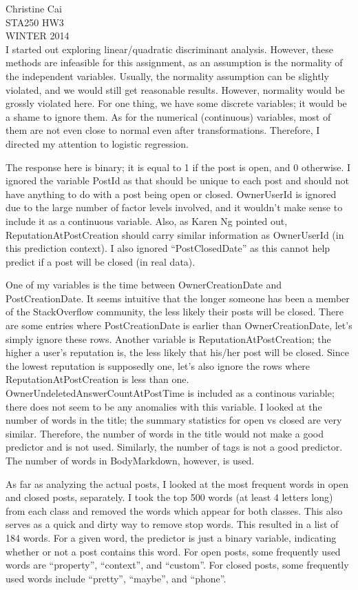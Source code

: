 \documentclass[12pt]{article}
\begin{document}
\noindent Christine Cai\\
STA250 HW3\\
WINTER 2014\\

I started out exploring linear/quadratic discriminant analysis. However, these methods are infeasible for this assignment, as an assumption is the normality of the independent variables. Usually, the normality assumption can be slightly violated, and we would still get reasonable results. However, normality would be grossly violated here. For one thing, we have some discrete variables; it would be a shame to ignore them. As for the numerical (continuous) variables, most of them are not even close to normal even after transformations. Therefore, I directed my attention to logistic regression.

The response here is binary; it is equal to 1 if the post is open, and 0 otherwise. I ignored the variable PostId as that should be unique to each post and should not have anything to do with a post being open or closed. OwnerUserId is ignored due to the large number of factor levels involved, and it wouldn't make sense to include it as a continuous variable. Also, as Karen Ng pointed out, ReputationAtPostCreation should carry similar information as OwnerUserId (in this prediction context). I also ignored ``PostClosedDate'' as this cannot help predict if a post will be closed (in real data).

One of my variables is the time between OwnerCreationDate and PostCreationDate. It seems intuitive that the longer someone has been a member of the StackOverflow community, the less likely their posts will be closed. There are some entries where PostCreationDate is earlier than OwnerCreationDate, let's simply ignore these rows. Another variable is ReputationAtPostCreation; the higher a user's reputation is, the less likely that his/her post will be closed. Since the lowest reputation is supposedly one, let's also ignore the rows where ReputationAtPostCreation is less than one. OwnerUndeletedAnswerCountAtPostTime is included as a continous variable; there does not seem to be any anomalies with this variable. I looked at the number of words in the title; the summary statistics for open vs closed are very similar. Therefore, the number of words in the title would not make a good predictor and is not used. Similarly, the number of tags is not a good predictor. The number of words in BodyMarkdown, however, is used.

As far as analyzing the actual posts, I looked at the most frequent words in open and closed posts, separately. I took the top 500 words (at least 4 letters long) from each class and removed the words which appear for both classes. This also serves as a quick and dirty way to remove stop words. This resulted in a list of 184 words. For a given word, the predictor is just a binary variable, indicating whether or not a post contains this word. For open posts, some frequently used words are ``property'', ``context'', and ``custom''. For closed posts, some frequently used words include ``pretty'', ``maybe'', and ``phone''.
\end{document}
